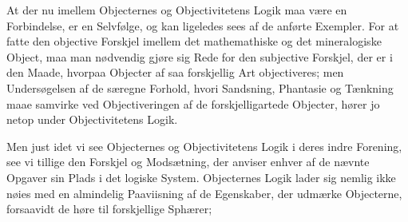 \documentclass[12pt]{book}
\begin{document}
At der nu imellem Objecternes og Objectivitetens Logik maa være en Forbindelse, er en Selvfølge, og kan
ligeledes sees af de anførte Exempler. For at fatte den objective Forskjel imellem det mathemathiske og
det mineralogiske Object, maa man nødvendig gjøre sig Rede for den subjective Forskjel, der er i den
Maade, hvorpaa Objecter af saa forskjellig Art objectiveres; men Undersøgelsen af de særegne Forhold,
hvori Sandsning, Phantasie og Tænkning maae samvirke ved Objectiveringen af de forskjelligartede
Objecter, hører jo netop under Objectivitetens Logik.

Men just idet vi see Objecternes og Objectivitetens Logik i deres indre Forening, see vi tillige den
Forskjel og Modsætning, der anviser enhver af de nævnte Opgaver sin Plads i det logiske System.
Objecternes Logik lader sig nemlig ikke nøies med en almindelig Paaviisning af de Egenskaber, der
udmærke Objecterne, forsaavidt de høre til forskjellige Sphærer;
\end{document}
